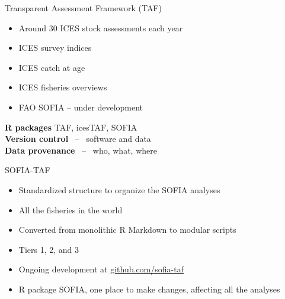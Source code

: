 \documentclass[aspectratio=169]{beamer}
\begin{document}

\begin{frame}{Transparent Assessment Framework (TAF)}\small
  \\
  \begin{itemize}
    \item[] Around 30 ICES stock assessments each year\\[-0.5ex]
    \item[] ICES survey indices\\[-0.5ex]
    \item[] ICES catch at age\\[-0.5ex]
    \item[] ICES fisheries overviews\\[-0.5ex]
    \item[] FAO SOFIA -- under development
  \end{itemize}
  \vspace{2ex}
  {\darkgreen\bf R packages} TAF, icesTAF, SOFIA\\[4ex]
  {\darkgreen\bf Version control} ~--~ software and data\\[4ex]
  {\darkgreen\bf Data provenance} ~--~ who, what, where
  \vspace{4ex}
\end{frame}


\begin{frame}{SOFIA-TAF}
  \begin{itemize}
    \item[] Standardized structure to organize the SOFIA analyses\\[3ex]
    \item[] All the fisheries in the world\\[3ex]
    \item[] Converted from monolithic R Markdown to modular scripts\\[3ex]
    \item[] Tiers 1, 2, and 3\\[3ex]
    \item[] Ongoing development at
    {\blue\href{https://github.com/sofia-taf}{github.com/sofia-taf}}\\[3ex]
    \item[] R package SOFIA, one place to make changes, affecting all the
    analyses
  \end{itemize}
\end{frame}
\end{document}
